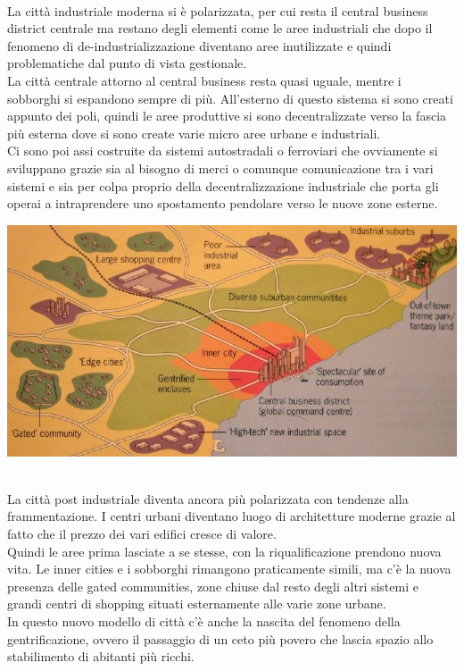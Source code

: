 \documentclass[a4paper,12pt, oneside]{book}
\begin{document}
  \leavevmode\\
  La città industriale moderna si è polarizzata, per cui resta il central business district centrale ma restano degli elementi come le aree industriali che dopo il fenomeno di de-industrializzazione diventano aree inutilizzate e quindi problematiche dal punto di vista gestionale.\\
  La città centrale attorno al central business resta quasi uguale, mentre i sobborghi si espandono sempre di più. All'esterno di questo sistema si sono creati appunto dei poli, quindi le aree produttive si sono decentralizzate verso la fascia più esterna dove si sono create varie micro aree urbane e industriali.\\
  Ci sono poi assi costruite da sistemi autostradali o ferroviari che ovviamente si sviluppano grazie sia al bisogno di merci o comunque comunicazione tra i vari sistemi e sia per colpa proprio della decentralizzazione industriale che porta gli operai a intraprendere uno spostamento pendolare verso le nuove zone esterne.\\
  \begin{center}
  	\includegraphics[width=0.6\linewidth]{"immagini/konx and pinch post industrial +"}
  	\label{fig:konx and pinch post industrial+}
  \end{center}
  \leavevmode\\ 
  La città post industriale diventa ancora più polarizzata con tendenze alla frammentazione. I centri urbani diventano luogo di architetture moderne grazie al fatto che il prezzo dei vari edifici cresce di valore.\\
  Quindi le aree prima lasciate a se stesse, con la riqualificazione prendono nuova vita. Le inner cities e i sobborghi rimangono praticamente simili, ma c'è la nuova presenza delle gated communities, zone chiuse dal resto degli altri sistemi e grandi centri di shopping situati esternamente alle varie zone urbane.\\
  In questo nuovo modello di città c'è anche la nascita del fenomeno della gentrificazione, ovvero il passaggio di un ceto più povero che lascia spazio allo stabilimento di abitanti più ricchi.\\
\end{document}
